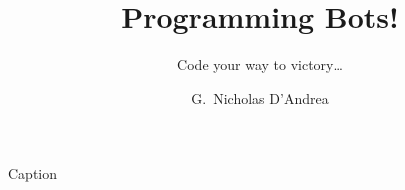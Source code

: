 \documentclass{prosper}
\title{Programming Bots!}
\subtitle{Code your way to victory\dots}
\author{G.~Nicholas D'Andrea}
\begin{document}
\maketitle


\begin{slide}{Caption}
\end{slide}
\end{document}
